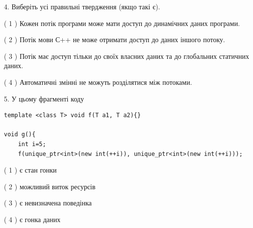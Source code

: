 \documentclass[12pt, ukrainian]{article}
\begin{document}
\begin {large}
{%
4. Виберіть усі правильні твердження (якщо такі є).\par
\vspace{2mm}

( 1 ) Кожен потік програми може мати доступ до динамічних даних програми.%

( 2 ) Потік мови С++ не може отримати доступ до даних іншого потоку.%

( 3 ) Потік має доступ тільки до своїх власних даних та до глобальних статичних даних.%

( 4 ) Автоматичні змінні не можуть розділятися між потоками.%


5. У цьому фрагменті коду
\begin{verbatim}
template <class T> void f(T a1, T a2){}

void g(){
    int i=5;
    f(unique_ptr<int>(new int(++i)), unique_ptr<int>(new int(++i)));
\end{verbatim}

( 1 ) є стан гонки%

( 2 ) можливий виток ресурсів%

( 3 ) є невизначена поведінка%

( 4 ) є гонка даних%
}
\end {large}
\end{document}
